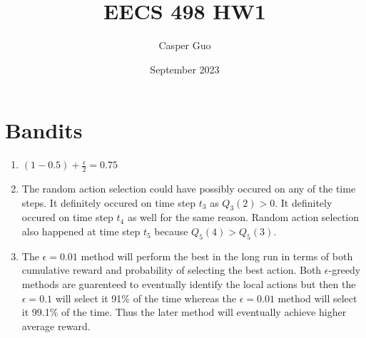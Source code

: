 \documentclass{article}
\title{EECS 498 HW1}
\author{Casper Guo}
\date{September 2023}
\newcommand{\estimatedvalue}[2]{Q_{#1}(#2)}
\begin{document}
\maketitle

\section{Bandits}
\begin{enumerate}
    \item $(1 - 0.5) + \frac{\epsilon}{2} = 0.75$
    \item The random action selection could have possibly occured on any of the time steps. It definitely occured on time step $t_3$ as $\estimatedvalue{3}{2} > 0$. It definitely occured on time step $t_4$ as well for the same reason. Random action selection also happened at time step $t_5$ because $\estimatedvalue{5}{4} > \estimatedvalue{5}{3}$.
    \item The $\epsilon = 0.01$ method will perform the best in the long run in terms of both cumulative reward and probability of selecting the best action. Both $\epsilon$-greedy methods are guarenteed to eventually identify the local actions but then the $\epsilon = 0.1$ will select it 91\% of the time whereas the $\epsilon = 0.01$ method will select it 99.1\% of the time. Thus the later method will eventually achieve higher average reward.
\end{enumerate}
\end{document}
